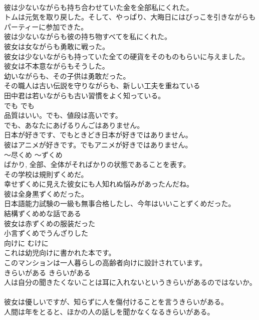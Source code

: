 \documentclass[8pt]{extreport}
\begin{document}
\begin{CJK}{UTF8}{min}
\\	彼は少ないながらも持ち合わせていた金を全部私にくれた。  
\\	トムは元気を取り戻した。そして、やっぱり、大晦日にはびっこを引きながらもパーティーに参加できた。   
\\	彼は少ないながらも彼の持ち物すべてを私にくれた。  
\\	彼女は女ながらも勇敢に戦った。   
\\	彼女は少ないながらも持っていた全ての硬貨をそのものもらいに与えました。   
\\	彼女は不本意ながらもそうした。  
\\	幼いながらも、その子供は勇敢だった。  
\\	その職人は古い伝説を守りながらも、新しい工夫を重ねている  
\\	田中君は若いながらも古い習慣をよく知っている。  
\\	でも	でも	
\\	品質はいい。でも、値段は高いです。
\\	でも、あなたにあげるりんごはありません。
\\	日本が好きです、でもときどき日本が好きではありません。  
\\	彼はアニメが好きです。でもアニメが好きではありません。  
\\	〜尽くめ	〜ずくめ	
\\	ばかり, 全部、全体がそればかりの状態であることを表す。	
\\	その学校は規則ずくめだ。  
\\	幸せずくめに見えた彼女にも人知れぬ悩みがあったんだね。  
\\	彼は全身黒ずくめだった。  
\\	日本語能力試験の一級も無事合格したし、今年はいいことずくめだった。  
\\	結構ずくめめな話である  
\\	彼女は赤ずくめの服装だった  
\\	小言ずくめでうんざりした  
\\	向けに	むけに	
\\	これは幼児向けに書かれた本です。 
\\	このマンションは一人暮らしの高齢者向けに設計されています。  
\\	きらいがある	きらいがある	
\\	人は自分の聞きたくないことは耳に入れないというきらいがあるのではないか。   
\\	彼女は優しいですが、知らずに人を傷付けることを言うきらいがある。  
\\	人間は年をとると、ほかの人の話しを聞かなくなるきらいがある。  

\end{CJK}
\end{document}

